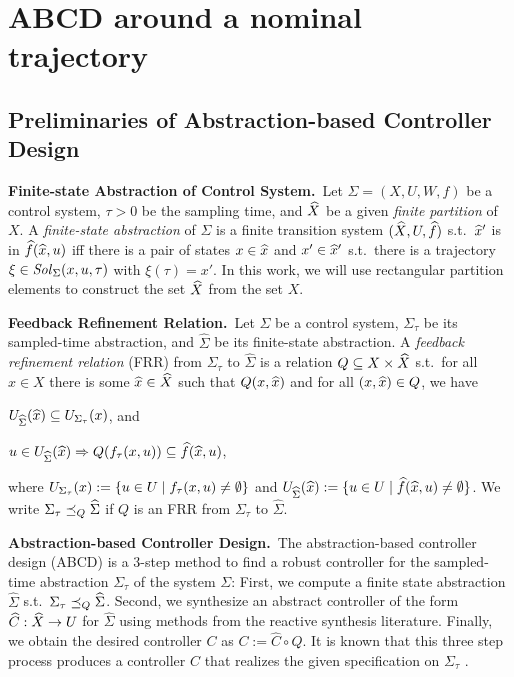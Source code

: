 
\section{ABCD around a nominal trajectory}

\subsection{Preliminaries of Abstraction-based Controller Design}

\smallskip
\noindent\textbf{Finite-state Abstraction of Control System.}\
Let $\Sigma = (X, U, W, f)$ be a control system, $\tau>0$ be the sampling time, and $\widehat{X}$ be a given \emph{finite partition} of $X$.
A \emph{finite-state abstraction} of $\Sigma$ is a finite transition system $(\widehat{X},U,\widehat{f})$ s.t.\ $\widehat{x}'$ is in $\widehat{f}(\widehat{x},u)$ iff there is a pair of states $x\in \widehat{x}$ and $x'\in \widehat{x}'$ s.t.\ there is a trajectory $\xi\in \mathit{Sol}_\Sigma(x,u,\tau)$ with $\xi(\tau)=x'$.
In this work, we will use rectangular partition elements to construct the set $\widehat{X}$ from the set $X$.

\smallskip
\noindent\textbf{Feedback Refinement Relation.}\
Let $\Sigma$ be a control system, $\Sigma_\tau$ be its sampled-time abstraction, and $\widehat{\Sigma}$ be its finite-state abstraction.
A \emph{feedback refinement relation} (FRR) from $\Sigma_\tau$ to $\widehat{\Sigma}$ 
is a relation $Q\subseteq X\times \widehat{X}$ s.t.\ 
for all $x\in X$ there is some $\widehat{x}\in \widehat{X}$ such that $Q(x,\widehat{x})$ and
for all $(x,\widehat{x})\in Q$, we have
\begin{inparaenum}[(i)]
 \item $U_{\widehat{\Sigma}}(\widehat{x})\subseteq U_{\Sigma_\tau}(x)$, and 
 \item $u\in U_{\widehat{\Sigma}}(\widehat{x}) \Rightarrow Q(f_\tau(x,u))\subseteq \widehat{f}(\widehat{x},u)$,
\end{inparaenum}
where $U_{\Sigma_\tau}(x):=\{ u\in U \mid f_\tau(x,u)\neq \emptyset \}$ and $U_{\widehat{\Sigma}}(\widehat{x}):=\{ u\in U \mid \widehat{f}(\widehat{x},u)\neq \emptyset \}$.
We write $\Sigma_\tau \preceq_{Q} \widehat{\Sigma}$ if $Q$ is an FRR from $\Sigma_\tau$ to $\widehat{\Sigma}$.

\smallskip
\noindent\textbf{Abstraction-based Controller Design.}\
The abstraction-based controller design (ABCD) \cite{FRR} is a $3$-step method to find a robust controller for the sampled-time abstraction $\Sigma_\tau$ of the system $\Sigma$:
First, we compute a finite state abstraction $\widehat{\Sigma}$ s.t.\ $\Sigma_\tau \preceq_{Q} \widehat{\Sigma}$.
Second, we synthesize an abstract controller of the form $\widehat{C}:\widehat{X}\rightarrow U$ for $\widehat{\Sigma}$ using methods from the reactive synthesis literature.
Finally, we obtain the desired controller $C$ as $C:=\widehat{C}\circ Q$.
It is known that this three step process produces a controller $C$ that realizes the given specification on $\Sigma_\tau$ \cite{FRR}.

